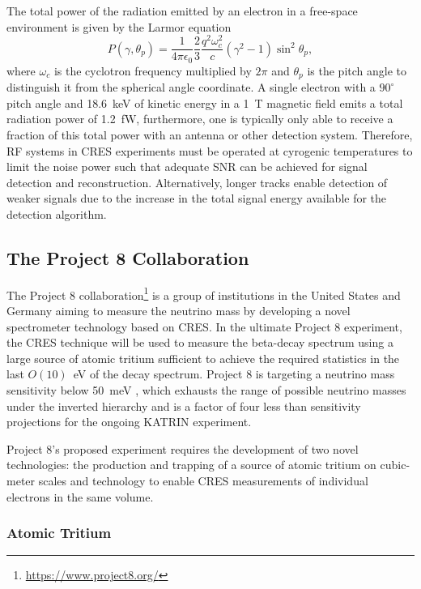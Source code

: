 The total power of the radiation emitted by an electron in a free-space environment is given by the Larmor equation \cite{larmor_eqn}
\begin{equation}
    P(\gamma, \theta_p)=\frac{1}{4\pi\epsilon_0}\frac{2}{3}\frac{q^2\omega_c^2}{c}(\gamma^2 - 1)\sin^2{\theta_p},
\end{equation}
where $\omega_c$ is the cyclotron frequency multiplied by $2\pi$ and $\theta_p$ is the pitch angle to distinguish it from the spherical angle coordinate. A single electron with a $90^\circ$ pitch angle and 18.6~keV of kinetic energy in a 1~T magnetic field emits a total radiation power of 1.2~fW, furthermore, one is typically only able to receive a fraction of this total power with an antenna or other detection system. Therefore, RF systems in CRES experiments must be operated at cyrogenic temperatures to limit the noise power such that adequate SNR can be achieved for signal detection and reconstruction. Alternatively, longer tracks enable detection of weaker signals due to the increase in the total signal energy available for the detection algorithm.

\subsection{The Project 8 Collaboration}

The Project 8 collaboration\footnote{\url{https://www.project8.org/}} is a group of institutions in the United States and Germany aiming to measure the neutrino mass by developing a novel spectrometer technology based on CRES. In the ultimate Project 8 experiment, the CRES technique will be used to measure the beta-decay spectrum using a large source of atomic tritium sufficient to achieve the required statistics in the last $O(10)$~eV of the decay spectrum. Project 8 is targeting a neutrino mass sensitivity below 50~meV \cite{p8snomass}, which exhausts the range of possible neutrino masses under the inverted hierarchy and is a factor of four less than sensitivity projections for the ongoing KATRIN experiment.

Project 8's proposed experiment requires the development of two novel technologies: the production and trapping of a source of atomic tritium on cubic-meter scales and technology to enable CRES measurements of individual electrons in the same volume. 

\subsubsection*{Atomic Tritium}

